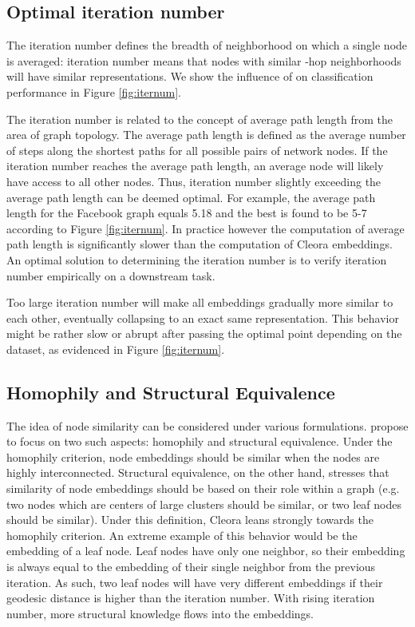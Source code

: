 \documentclass{IEEEtran}
\begin{document}
\subsection{Optimal iteration number}
The iteration number defines the breadth of neighborhood on which a single node is averaged: iteration number  means that nodes with similar -hop neighborhoods will have similar representations. We show the influence of  on classification performance in Figure \ref{fig:iternum}.

The iteration number is related to the concept of average path length from the area of graph topology. The average path length is defined as the average number of steps along the shortest paths for all possible pairs of network nodes. If the iteration number reaches the average path length, an average node will likely have access to all other nodes. Thus, iteration number slightly exceeding the average path length can be deemed optimal. For example, the average path length for the Facebook graph equals 5.18 and the best  is found to be 5-7 according to Figure \ref{fig:iternum}. In practice however the computation of average path length is significantly slower than the computation of Cleora embeddings. An optimal solution to determining the iteration number is to verify iteration number empirically on a downstream task. 

Too large iteration number will make all embeddings gradually more similar to each other, eventually collapsing to an exact same representation. This behavior might be rather slow or abrupt after passing the optimal point depending on the dataset, as evidenced in Figure \ref{fig:iternum}.

\subsection{Homophily and Structural Equivalence}
The idea of node similarity can be considered under various formulations. \cite{grover2016node2vec} propose to focus on two such aspects: homophily \cite{doi:10.1146/annurev.soc.27.1.415} and structural equivalence. Under the homophily criterion, node embeddings should be similar when the nodes are highly interconnected. Structural equivalence, on the other hand, stresses that similarity of node embeddings should be based on their role within a graph (e.g. two nodes which are centers of large clusters should be similar, or two leaf nodes should be similar). Under this definition, Cleora leans strongly towards the homophily criterion. An extreme example of this behavior would be the embedding of a leaf node. Leaf nodes have only one neighbor, so their embedding is always equal to the embedding of their single neighbor from the previous iteration. As such, two leaf nodes will have very different embeddings if their geodesic distance is higher than the iteration number. With rising iteration number, more structural knowledge flows into the embeddings.
\end{document}
